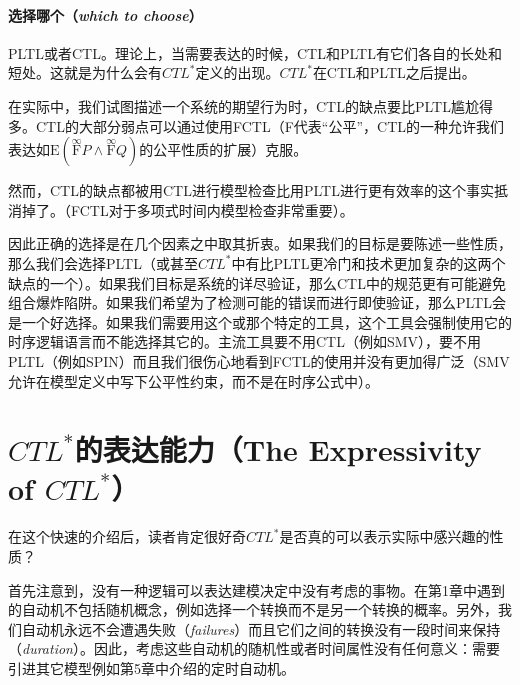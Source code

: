 \documentclass{book}
\begin{document}
    \paragraph{选择哪个（{\itshape  which to choose}）}PLTL或者CTL。理论上，当需要表达的时候，CTL和PLTL有它们各自的长处和短处。这就是为什么会有$CTL^*$定义的出现。$CTL^*$在CTL和PLTL之后提出。

    在实际中，我们试图描述一个系统的期望行为时，CTL的缺点要比PLTL尴尬得多。CTL的大部分弱点可以通过使用FCTL（F代表“公平”，CTL的一种允许我们表达如$\mathrm{E}(\overset{\infty}{\mathrm{F}}P\wedge\overset{\infty}{\mathrm{F}}Q)$的公平性质的扩展）克服。

    然而，CTL的缺点都被用CTL进行模型检查比用PLTL进行更有效率的这个事实抵消掉了。（FCTL对于多项式时间内模型检查非常重要）。

    因此正确的选择是在几个因素之中取其折衷。如果我们的目标是要陈述一些性质，那么我们会选择PLTL（或甚至$CTL^*$中有比PLTL更冷门和技术更加复杂的这两个缺点的一个）。如果我们目标是系统的详尽验证，那么CTL中的规范更有可能避免组合爆炸陷阱。如果我们希望为了检测可能的错误而进行即使验证，那么PLTL会是一个好选择。如果我们需要用这个或那个特定的工具，这个工具会强制使用它的时序逻辑语言而不能选择其它的。主流工具要不用CTL（例如SMV），要不用PLTL（例如SPIN）而且我们很伤心地看到FCTL的使用并没有更加得广泛（SMV允许在模型定义中写下公平性约束，而不是在时序公式中）。

    \section{$CTL^*$的表达能力（The Expressivity of $CTL^*$）}

    \quad 在这个快速的介绍后，读者肯定很好奇$CTL^*$是否真的可以表示实际中感兴趣的性质？

    首先注意到，没有一种逻辑可以表达建模决定中没有考虑的事物。在第1章中遇到的自动机不包括随机概念，例如选择一个转换而不是另一个转换的概率。另外，我们自动机永远不会遭遇失败（{\itshape failures}）而且它们之间的转换没有一段时间来保持（{\itshape duration}）。因此，考虑这些自动机的随机性或者时间属性没有任何意义：需要引进其它模型例如第5章中介绍的定时自动机。
\end{document}

